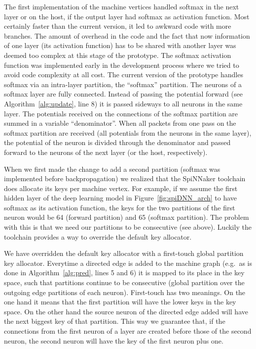\documentclass[]{article}
\begin{document}
The first implementation of the machine vertices handled softmax
in the next layer or on the host, if the output layer had softmax as
activation function.
Most certainly faster than the current version, it led to awkward
code with more branches.
The amount of overhead in the code and the fact that now information
of one layer (its activation function) has to be shared with another
layer was deemed too complex at this stage of the prototype.
The softmax activation function was implemented early in the
development process where we tried to avoid code complexity at all
cost.
The current version of the prototype handles softmax via an
intra-layer partition, the ``softmax'' partition.
The neurons of a softmax layer are fully connected.
Instead of passing the potential forward (see
Algorithm~\ref{alg:update}, line 8) it is passed sideways to all
neurons in the same layer.
The potentials received on the connections of the softmax partition
are summed in a variable ``denominator''.
When all packets from one pass on the softmax partition are received
(all potentials from the neurons in the same layer), the potential of
the neuron is divided through the denominator and passed forward to
the neurons of the next layer (or the host, respectively).

When we first made the change to add a second partition (softmax
was implemented before backpropagation) we realized that the
SpiNNaker toolchain does allocate its keys per machine vertex.
For example, if we assume the first hidden layer of the deep learning
model in Figure~\ref{fig:spiDNN_arch} to have softmax as its
activation function, the keys for the two partitions of the first
neuron would be 64 (forward partition) and 65 (softmax partition).
The problem with this is that we need our partitions to be
consecutive (see above).
Luckily the toolchain provides a way to override the default key
allocator.

We have overridden the default key allocator with a first-touch
global partition key allocator.
Everytime a directed edge is added to the machine graph (e.g.\ as
is done in Algorithm~\ref{alg:pred}, lines 5 and 6) it is mapped to
its place in the key space, such that partitions continue to be
consecutive (global partition over the outgoing edge partitions of
each neuron).
First-touch has two meanings.
On the one hand it means that the first partition will have the lower
keys in the key space.
On the other hand the source neuron of the directed edge added will
have the next biggest key of that partition.
This way we guarantee that, if the connections from the first neuron
of a layer are created before those of the second neuron, the second
neuron will have the key of the first neuron plus one.
\end{document}
